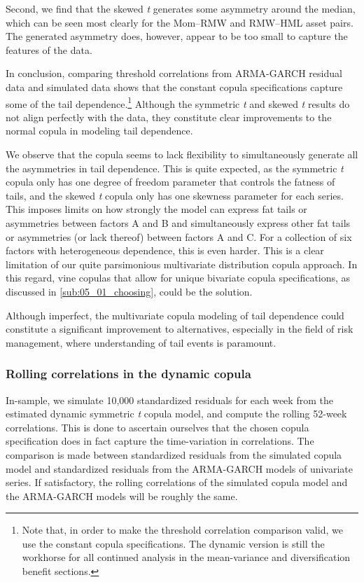 Second, we find that the skewed \textit{t} generates some asymmetry around the median, which can be seen most clearly for the Mom--RMW and RMW--HML asset pairs. The generated asymmetry does, however, appear to be too small to capture the features of the data.

In conclusion, comparing threshold correlations from ARMA-GARCH residual data and simulated data shows that the constant copula specifications capture some of the tail dependence.\footnote{Note that, in order to make the threshold correlation comparison valid, we use the constant copula specifications. The dynamic version is still the workhorse for all continued analysis in the mean-variance and diversification benefit sections.} Although the symmetric \textit{t} and skewed \textit{t} results do not align perfectly with the data, they constitute clear improvements to the normal copula in modeling tail dependence. 

We observe that the copula seems to lack flexibility to simultaneously generate all the asymmetries in tail dependence. This is quite expected, as the symmetric \textit{t} copula only has one degree of freedom parameter that controls the fatness of tails, and the skewed \textit{t} copula only has one skewness parameter for each series. This imposes limits on how strongly the model can express fat tails or asymmetries between factors A and B and simultaneously express other fat tails or asymmetries (or lack thereof) between factors A and C. For a collection of six factors with heterogeneous dependence, this is even harder. This is a clear limitation of our quite parsimonious multivariate distribution copula approach. In this regard, vine copulas that allow for unique bivariate copula specifications, as discussed in \autoref{sub:05_01_choosing}, could be the solution.

Although imperfect, the multivariate copula modeling of tail dependence could constitute a significant improvement to alternatives, especially in the field of risk management, where understanding of tail events is paramount.

\subsubsection{Rolling correlations in the dynamic copula}

In-sample, we simulate 10,000 standardized residuals for each week from the estimated dynamic symmetric \textit{t} copula model, and compute the rolling 52-week correlations. This is done to ascertain ourselves that the chosen copula specification does in fact capture the time-variation in correlations. The comparison is made between standardized residuals from the simulated copula model and standardized residuals from the ARMA-GARCH models of univariate series. If satisfactory, the rolling correlations of the simulated copula model and the ARMA-GARCH models will be roughly the same.

